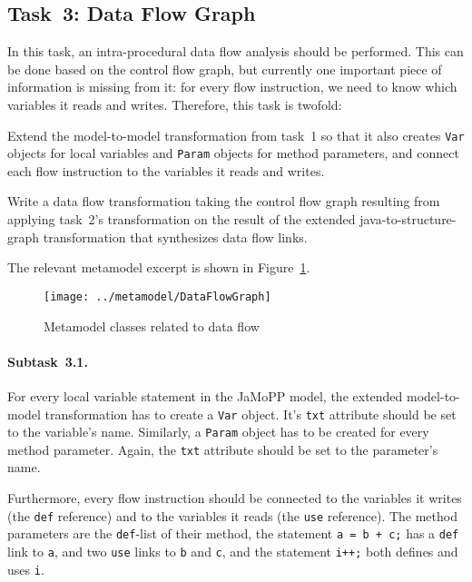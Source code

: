 \documentclass[submission,copyright,creativecommons]{eptcs}
\begin{document}
\subsection{Task~3: Data Flow Graph}
\label{sec:task3-df-graph}

In this task, an intra-procedural data flow analysis should be performed.  This
can be done based on the control flow graph, but currently one important piece
of information is missing from it: for every flow instruction, we need to know
which variables it reads and writes.  Therefore, this task is twofold:

\begin{compactenum}
\item Extend the model-to-model transformation from task~1 so that it also
  creates \verb|Var| objects for local variables and \verb|Param| objects for
  method parameters, and connect each flow instruction to the variables it
  reads and writes.
\item Write a data flow transformation taking the control flow graph resulting
  from applying task~2's transformation on the result of the extended
  java-to-structure-graph transformation that synthesizes data flow links.
\end{compactenum}

The relevant metamodel excerpt is shown in Figure~\ref{fig:data-flow-mm}.

\begin{figure}[h!]
  \centering
  \texttt{[image: ../metamodel/DataFlowGraph]}
  \caption{Metamodel classes related to data flow}
  \label{fig:data-flow-mm}
\end{figure}

\paragraph{Subtask~3.1.}
\label{sec:subtask-3.1}

For every local variable statement in the JaMoPP model, the extended
model-to-model transformation has to create a \verb|Var| object.  It's
\verb|txt| attribute should be set to the variable's name.  Similarly, a
\verb|Param| object has to be created for every method parameter.  Again, the
\verb|txt| attribute should be set to the parameter's name.

Furthermore, every flow instruction should be connected to the variables it
writes (the \verb|def| reference) and to the variables it reads (the \verb|use|
reference).  The method parameters are the \verb|def|-list of their method, the
statement \verb|a = b + c;| has a \verb|def| link to \verb|a|, and two
\verb|use| links to \verb|b| and \verb|c|, and the statement \verb|i++;| both
defines and uses \verb|i|.
\end{document}
